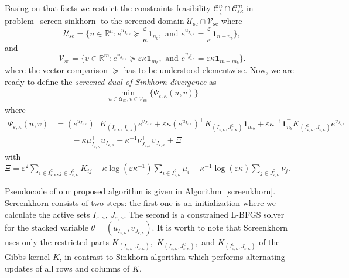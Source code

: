 \documentclass{article}
\newcommand{\R}{{\mathbb{R}}}
\begin{document}
Basing on that facts we restrict the constraints feasibility $\mathcal{C}^n_{\frac \varepsilon \kappa} \cap \mathcal{C}^m_{\varepsilon\kappa}$ in problem~\eqref{screen-sinkhorn} to the screened domain $\mathcal{U}_{\text{sc}} \cap \mathcal{V}_{\text{sc}}$ where 
\begin{equation*}
\mathcal{U}_{\text{sc}} = \{u \in \R^n: e^{u_{I_{\varepsilon,\kappa}}} \succeq \frac \varepsilon\kappa\mathbf 1_{n_b}, \text{ and } e^{u_{I^\complement_{\varepsilon,\kappa}}} = \frac\varepsilon\kappa\mathbf 1_{n - n_b}\},
\end{equation*}
and 
\begin{equation*}
	\mathcal{V}_{\text{sc}} =\{v\in\R^m: e^{v_{J_{\varepsilon,\kappa}}} \succeq \varepsilon\kappa \mathbf{1}_{m_b}, \text{ and } e^{v_{J^\complement_{\varepsilon,\kappa}}} = \varepsilon\kappa \mathbf 1_{m- m_b}\}.
\end{equation*}
where the vector comparison $\succeq$ has to be understood elementwise.
Now, we are ready to define the \emph{screened dual of Sinkhorn divergence} as 
\begin{align}
\label{screen-sinkhorn_second_def}
\min_{u \in \mathcal{U}_{\text{sc}}, v \in \mathcal{V}_{\text{sc}}}\{\Psi_{\varepsilon, \kappa}(u,v)\}
\end{align}
where 
\begin{align*} 
\Psi_{\varepsilon,\kappa}(u, v) &= (e^{u_{I_{\varepsilon,\kappa}}})^\top K_{(I_{\varepsilon,\kappa}, J_{\varepsilon,\kappa})} e^{v_{J_{\varepsilon,\kappa}}} + 
\varepsilon \kappa (e^{u_{I_{\varepsilon,\kappa}}})^\top K_{(I_{\varepsilon,\kappa}, J^\complement_{\varepsilon,\kappa})}\mathbf 1_{m_b} + \varepsilon \kappa^{-1} \mathbf 1_{n_b}^\top K_{(I^\complement_{\varepsilon,\kappa}, J_{\varepsilon,\kappa})}e^{v_{J_{\varepsilon,\kappa}}}\\
&\qquad - \kappa \mu_{I_{\varepsilon,\kappa}}^\top u_{I_{\varepsilon,\kappa}} - \kappa^{-1} \nu_{J_{\varepsilon,\kappa}}^\top v_{J_{\varepsilon,\kappa}} + \Xi
\end{align*}
with $\Xi = \varepsilon^2 \sum_{i \in I^\complement_{\varepsilon,\kappa}, j \in J^\complement_{\varepsilon,\kappa}} K_{ij} -\kappa \log(\varepsilon\kappa^{-1})\sum_{i \in I^\complement_{\varepsilon,\kappa}}\mu_i - \kappa^{-1} \log(\varepsilon\kappa)\sum_{j\in J^\complement_{\varepsilon,\kappa}} \nu_j$.

Pseudocode of our proposed algorithm is given in Algorithm~\ref{screenkhorn}.
Screenkhorn consists of two steps: the first one is an initialization where we calculate the active sets $I_{\varepsilon,\kappa}$, $J_{\varepsilon,\kappa}$. 
The second is a constrained L-BFGS solver~\cite{zhu1997-LBFGS} for the stacked variable $\theta=(u_{I_{\varepsilon,\kappa}},v_{J_{\varepsilon,\kappa}}).$ 
It is worth to note that Screenkhorn uses only the restricted parts $K_{(I_{\varepsilon,\kappa}, J_{\varepsilon,\kappa})},$ $K_{(I_{\varepsilon,\kappa}, J^\complement_{\varepsilon,\kappa})},$ and $K_{(I^\complement_{\varepsilon,\kappa}, J_{\varepsilon,\kappa})}$ of the Gibbs kernel $K$, in contrast to Sinkhorn algorithm which performs alternating updates of all rows and columns of $K.$
\end{document}
